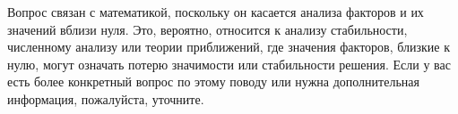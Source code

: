 \documentclass{article}
\begin{document}
Вопрос связан с математикой, поскольку он касается анализа факторов и их значений вблизи нуля. Это, вероятно, относится к анализу стабильности, численному анализу или теории приближений, где значения факторов, близкие к нулю, могут означать потерю значимости или стабильности решения. Если у вас есть более конкретный вопрос по этому поводу или нужна дополнительная информация, пожалуйста, уточните.
\end{document}
